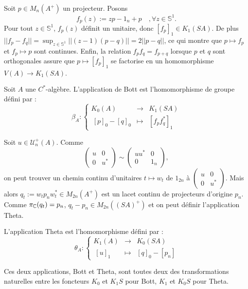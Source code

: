 Soit $p\in M_n(A^+)$ un projecteur. Posons 
\[f_p(z):= zp-1_n+p\quad, \forall z\in \mathbb S^1.\]
Pour tout $z\in \mathbb S^1$, $f_p(z)$ définit un unitaire, donc $[f_p]_1\in K_1(SA)$. De plus $||f_p-f_q||=\sup_{z\in \mathbb S^1}||(z-1)(p-q)||=2||p-q||$, ce qui montre que $p\mapsto f_p$ et $f_p\mapsto p$ sont continues. Enfin, la relation $f_p f_q=f_{p+q}$ lorsque $p$ et $q$ sont orthogonales assure que $p\mapsto [f_p]_1$ se factorise en un homomorphisme $V(A)\rightarrow K_1(SA)$. 

\begin{definition}
Soit $A$ une $C^*$-algèbre. L'application de Bott est l'homomorphisme de groupe défini par :
\[\beta_A : \left\{ \begin{array}{rcl} K_0(A) & \rightarrow & K_1(SA) \\ 
\ [p]_0-[q]_0 & \mapsto & [f_p f_q^*]_1\end{array}\right.\]
\end{definition}

Soit $u \in \mathcal U_n^+(A)$. Comme 
\[\begin{pmatrix} u & 0 \\ 0 & u^*\end{pmatrix} \sim \begin{pmatrix} uu^* & 0 \\ 0 & 1_n \end{pmatrix},\]
on peut trouver un chemin continu d'unitaires $t\mapsto w_t$ de $1_{2n}$ à $\begin{pmatrix} u & 0 \\ 0 & u^*\end{pmatrix}$. Mais alors $q_t := w_t p_n w_t^* \in M_{2n}(A^+)$ est un lacet continu de projecteurs d'origine $p_n$. Comme $\pi_\mathbb C(q_t)=p_n$, $q_t-p_n \in M_{2n}((SA)^+)$ et on peut définir l'application Theta.

\begin{definition} L'application Theta est l'homomorphisme défini par :
\[\theta_A : \left\{ \begin{array}{rcl} K_1(A) & \rightarrow & K_0(SA) \\ 
\ [u]_1 & \mapsto & [q]_0 - [p_n]\end{array}\right.\]
\end{definition}

Ces deux applications, Bott et Theta, sont toutes deux des transformations naturelles entre les foncteurs $K_0$ et $K_1 S$ pour Bott, $K_1$ et $K_0 S $ pour Theta.\\
